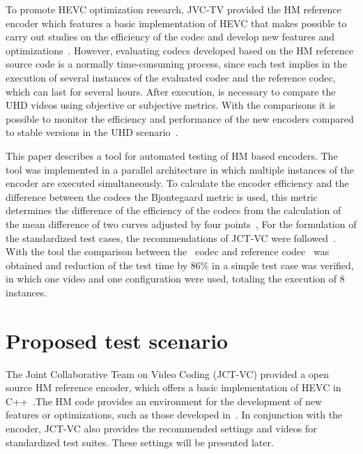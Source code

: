 \documentclass{acm_proc_article-sp}
\begin{document}
To promote HEVC optimization research, JVC-TV provided the HM reference encoder which features a basic implementation of HEVC that makes possible  to carry out studies on the efficiency of the codec and develop new features and optimizations~\cite{itu:10}. However, evaluating codecs developed based on the HM reference source code is a normally time-consuming process, since each test implies in the execution of several instances of the evaluated codec and the reference codec, which can last for several hours. After execution, is necessary to compare the UHD videos using objective or subjective metrics. With the comparisons it is possible to monitor the efficiency and performance of the new encoders compared to stable versions in the UHD scenario~\cite{netflix:16}.

This paper describes a tool for automated testing of HM based encoders. The tool was implemented in a parallel architecture in which multiple instances of the encoder are executed simultaneously. To calculate the encoder efficiency and the difference between the codecs the Bjontegaard metric is used, this metric determines the difference of the efficiency of the codecs from the calculation of the mean difference of two curves adjusted by four points~\cite{Bjontegaard:01}, For the formulation of the standardized test cases, the recommendations of JCT-VC were followed~\cite{Bossen:15}. With the tool the comparison between the~\cite{oliveira:16} codec and reference codec~\cite{itu:10} was obtained and reduction of the test time by 86\% in a simple test case was verified, in which one video and one configuration were used, totaling the execution of 8 instances.
	
	
\section{Proposed test scenario}
	



The Joint Collaborative Team on Video Coding (JCT-VC) provided a open source HM reference encoder, which offers a basic implementation of HEVC in C++~\cite{Bossen:15}.The HM code provides an environment for the development of new features or optimizations, such as those developed in~\cite{oliveira:16}\cite{Yoon:13}\cite{Correa:12}\cite{Weerakkody:14}. In conjunction with the encoder, JCT-VC also provides the recommended settings and videos for standardized test suites. These settings will be presented later.
\end{document}
